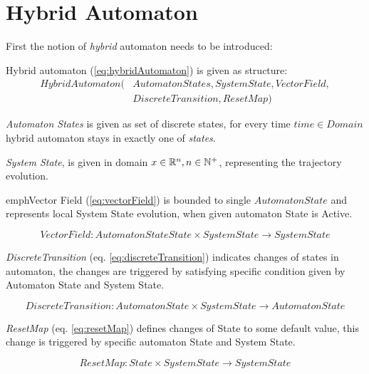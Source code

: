 \section{Hybrid Automaton}\label{s:HybridAutomaton}
    \noindent First the notion of  \emph{hybrid} automaton  \cite{lazar2006model,borrelli2006mpc,daws1996tool} needs to be introduced:

    \begin{definition}{Hybrid automaton} (\ref{eq:hybridAutomaton}) is given as structure:
        \begin{equation}\label{eq:hybridAutomaton}
        \begin{aligned}
            HybridAutomaton(&Automaton States, SystemState, VectorField, \\
                            &DiscreteTransition,ResetMap)
        \end{aligned}
        \end{equation}
    
        \noindent \emph{Automaton States} is given as set of discrete states, for every time $time\in Domain$ hybrid automaton stays in exactly one of \emph{states}.
    
        \emph{System State}, is given in domain $x\in\mathbb{R}^n,n\in\mathbb{N}^+$, representing the trajectory evolution.
        
        emph{Vector Field} (\ref{eq:vectorField}) is bounded to single $Automaton State$ and represents local System State evolution, when given automaton State is Active.
        
        \begin{equation}\label{eq:vectorField}
            VectorField: Automaton StateState\times SystemState \to SystemState
        \end{equation}
        
        \noindent\emph{DiscreteTransition} (eq. \ref{eq:discreteTransition}) indicates changes of states in automaton, the changes are triggered by satisfying specific condition given by Automaton State and System State. 
        
        \begin{equation}\label{eq:discreteTransition}
            DiscreteTransition:Automaton State\times SystemState \to Automaton State
        \end{equation}
        
        \noindent \emph{ResetMap} (eq. \ref{eq:resetMap}) defines changes of State to some default value, this change is triggered by specific automaton State and System State.
        
        \begin{equation}\label{eq:resetMap}
            ResetMap:State\times SystemState \to SystemState
        \end{equation}
    
    \end{definition}

